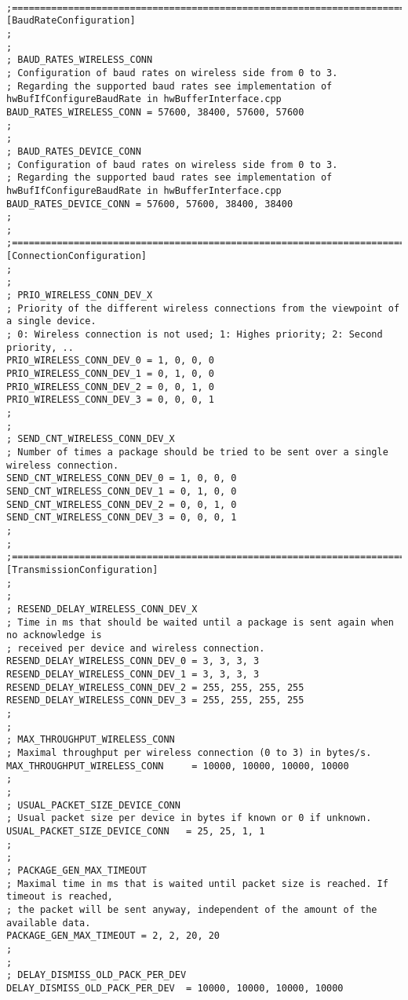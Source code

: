 \begin{lstlisting}

;========================================================================================
[BaudRateConfiguration]
;
;
; BAUD_RATES_WIRELESS_CONN
; Configuration of baud rates on wireless side from 0 to 3.
; Regarding the supported baud rates see implementation of hwBufIfConfigureBaudRate in hwBufferInterface.cpp
BAUD_RATES_WIRELESS_CONN = 57600, 38400, 57600, 57600
;
;
; BAUD_RATES_DEVICE_CONN
; Configuration of baud rates on wireless side from 0 to 3.
; Regarding the supported baud rates see implementation of hwBufIfConfigureBaudRate in hwBufferInterface.cpp
BAUD_RATES_DEVICE_CONN = 57600, 57600, 38400, 38400
;
;
;========================================================================================
[ConnectionConfiguration]
;
;
; PRIO_WIRELESS_CONN_DEV_X
; Priority of the different wireless connections from the viewpoint of a single device.
; 0: Wireless connection is not used; 1: Highes priority; 2: Second priority, ..
PRIO_WIRELESS_CONN_DEV_0 = 1, 0, 0, 0
PRIO_WIRELESS_CONN_DEV_1 = 0, 1, 0, 0
PRIO_WIRELESS_CONN_DEV_2 = 0, 0, 1, 0
PRIO_WIRELESS_CONN_DEV_3 = 0, 0, 0, 1
;
;
; SEND_CNT_WIRELESS_CONN_DEV_X
; Number of times a package should be tried to be sent over a single wireless connection.
SEND_CNT_WIRELESS_CONN_DEV_0 = 1, 0, 0, 0
SEND_CNT_WIRELESS_CONN_DEV_1 = 0, 1, 0, 0
SEND_CNT_WIRELESS_CONN_DEV_2 = 0, 0, 1, 0
SEND_CNT_WIRELESS_CONN_DEV_3 = 0, 0, 0, 1
;
;
;========================================================================================
[TransmissionConfiguration]
;
;
; RESEND_DELAY_WIRELESS_CONN_DEV_X
; Time in ms that should be waited until a package is sent again when no acknowledge is 
; received per device and wireless connection.
RESEND_DELAY_WIRELESS_CONN_DEV_0 = 3, 3, 3, 3
RESEND_DELAY_WIRELESS_CONN_DEV_1 = 3, 3, 3, 3
RESEND_DELAY_WIRELESS_CONN_DEV_2 = 255, 255, 255, 255
RESEND_DELAY_WIRELESS_CONN_DEV_3 = 255, 255, 255, 255
;
;
; MAX_THROUGHPUT_WIRELESS_CONN
; Maximal throughput per wireless connection (0 to 3) in bytes/s.
MAX_THROUGHPUT_WIRELESS_CONN	 = 10000, 10000, 10000, 10000
;
;
; USUAL_PACKET_SIZE_DEVICE_CONN
; Usual packet size per device in bytes if known or 0 if unknown.
USUAL_PACKET_SIZE_DEVICE_CONN	= 25, 25, 1, 1
;
;
; PACKAGE_GEN_MAX_TIMEOUT
; Maximal time in ms that is waited until packet size is reached. If timeout is reached, 
; the packet will be sent anyway, independent of the amount of the available data.
PACKAGE_GEN_MAX_TIMEOUT	= 2, 2, 20, 20
;
;
; DELAY_DISMISS_OLD_PACK_PER_DEV
DELAY_DISMISS_OLD_PACK_PER_DEV	= 10000, 10000, 10000, 10000

\end{lstlisting}

